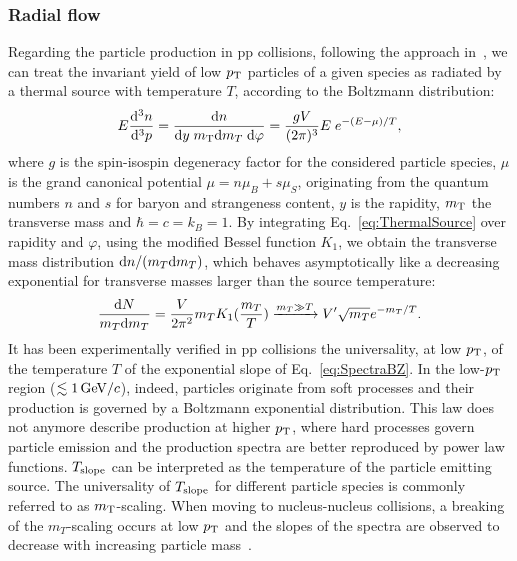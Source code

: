 \subsubsection{Radial flow}
\label{sec:RadialFlow}
Regarding the particle production in pp collisions, 
following the approach in~\cite{Schnedermann:1993ws}, we 
can treat the invariant yield of low $p_{\rm T}$ particles of a given species as radiated by a
 thermal source with temperature $T$, according to the Boltzmann distribution:
\begin{equation}
\label{eq:ThermalSource}
E\frac{{\rm d}^{3}n}{{\rm d}^3p} = \frac{{\rm d}n}{{\rm d}y \; m_{\rm T} {\rm d}m_T\;{\rm d}\varphi} = \frac{gV}{(2\pi)^3}E\;e^{-(E-\mu)/T},
\end{equation}
  where $g$ is the spin-isospin degeneracy factor for the considered particle 
  species, $\mu$ is the grand canonical potential $\mu = n\mu_{B}+ s\mu_S$, 
  originating from the quantum numbers $n$ and $s$ for baryon and 
  strangeness content, $y$ is the rapidity, $m_{\rm T}$ the transverse 
  mass and $\hbar = c = k_B = 1$. By integrating Eq.~\ref{eq:ThermalSource}
   over rapidity and $\varphi$, using the modified Bessel function $K_1$, we obtain
    the transverse mass distribution ${\rm d}n/(m_T{\rm d}m_T)$, which behaves 
    asymptotically like a decreasing exponential for transverse masses 
    larger than the source temperature: 
\begin{equation}
\label{eq:SpectraBZ}
\frac{{\rm d}N}{m_T {\rm d}m_T} = \frac{V}{2\pi^2} m_T K_1 (\frac{m_T}{T}) \xrightarrow{m_T \gg T} V^\prime \sqrt{m_T} e^{-m_T/T}.
\end{equation}
It has been experimentally verified in pp collisions the universality, at low $p_{\rm T}$,
of the temperature $T$ of the exponential slope of Eq.~\ref{eq:SpectraBZ}. 
In the low-$p_{\rm T}$ region ($\lesssim 1 \, \mathrm{GeV}/c$), indeed, particles originate from soft processes
and their production is governed by a Boltzmann exponential distribution. 
This law does not anymore describe production at higher $p_{\rm T}$, where hard processes
govern particle emission and the production spectra are better reproduced by power law functions.
 $T_{\rm slope}$ can be interpreted as the temperature of the particle
 emitting source. The universality of $T_{\rm slope}$ for different 
 particle species is commonly referred to as $m_{\rm T}$-scaling. When 
 moving to nucleus-nucleus collisions, a breaking of the $m_T$-scaling 
 occurs at low $p_{\rm T}$ and the slopes of the spectra are observed to 
 decrease with increasing particle mass~\cite{Appelshauser:1998yb,Arnaldi:2007ru}.
